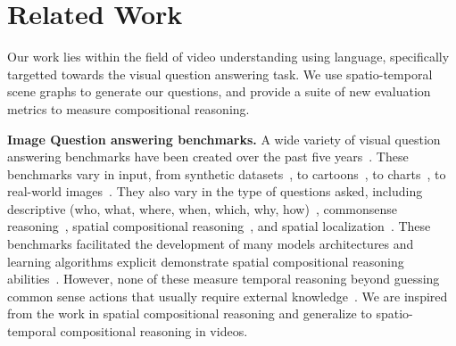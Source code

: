 
\section{Related Work}
Our work lies within the field of video understanding using language, specifically targetted towards the visual question answering task. We use spatio-temporal scene graphs to generate our questions, and provide a suite of new evaluation metrics to measure compositional reasoning.


\noindent\textbf{Image Question answering benchmarks.}
A wide variety of visual question answering benchmarks have been created over the past five years~\cite{johnson2017clevr,hudson2019gqa,antol2015vqa,zellers2019recognition,goyal2017making,krishna2017visual,zhu2016visual7w,kim2020answering}. These benchmarks vary in input, from synthetic datasets~\cite{johnson2017clevr}, to cartoons~\cite{antol2015vqa}, to charts~\cite{kim2017deepstory}, to real-world images~\cite{hudson2019gqa,krishna2017visual,zhu2016visual7w,goyal2017making,zellers2019recognition,antol2015vqa}. They also vary in the type of questions asked, including descriptive (who, what, where, when, which, why, how)~\cite{zhu2016visual7w}, commonsense reasoning~\cite{zellers2019recognition}, spatial compositional reasoning~\cite{johnson2017clevr,hudson2019gqa}, and spatial localization~\cite{zhu2016visual7w,krishna2017visual,hudson2019gqa}. These benchmarks facilitated the development of many models architectures and learning algorithms explicit demonstrate spatial compositional reasoning abilities~\cite{lu2016hierarchical,vatashsky2020vqa,chen2020counterfactual}. However, none of these measure temporal reasoning beyond guessing common sense actions that usually require external knowledge~\cite{zellers2019recognition}. We are inspired from the work in spatial compositional reasoning and generalize to spatio-temporal compositional reasoning in videos.

